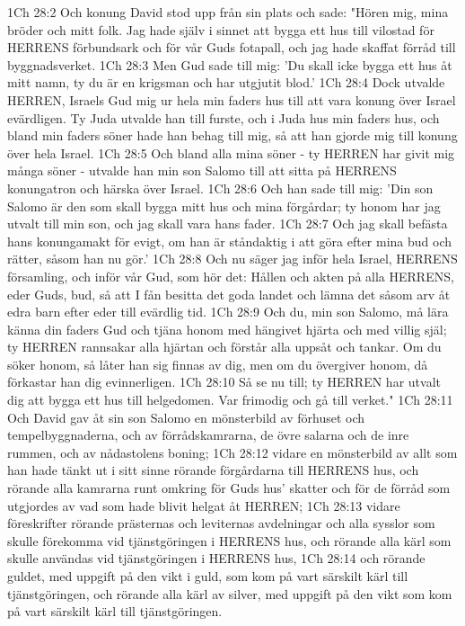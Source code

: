 1Ch 28:2  Och konung David stod upp från sin plats och sade: "Hören mig, mina bröder och mitt folk. Jag hade själv i sinnet att bygga ett hus till vilostad för HERRENS förbundsark och för vår Guds fotapall, och jag hade skaffat förråd till byggnadsverket.
1Ch 28:3  Men Gud sade till mig: 'Du skall icke bygga ett hus åt mitt namn, ty du är en krigsman och har utgjutit blod.'
1Ch 28:4  Dock utvalde HERREN, Israels Gud mig ur hela min faders hus till att vara konung över Israel evärdligen. Ty Juda utvalde han till furste, och i Juda hus min faders hus, och bland min faders söner hade han behag till mig, så att han gjorde mig till konung över hela Israel.
1Ch 28:5  Och bland alla mina söner - ty HERREN har givit mig många söner - utvalde han min son Salomo till att sitta på HERRENS konungatron och härska över Israel.
1Ch 28:6  Och han sade till mig: 'Din son Salomo är den som skall bygga mitt hus och mina förgårdar; ty honom har jag utvalt till min son, och jag skall vara hans fader.
1Ch 28:7  Och jag skall befästa hans konungamakt för evigt, om han är ståndaktig i att göra efter mina bud och rätter, såsom han nu gör.'
1Ch 28:8  Och nu säger jag inför hela Israel, HERRENS församling, och inför vår Gud, som hör det: Hållen och akten på alla HERRENS, eder Guds, bud, så att I fån besitta det goda landet och lämna det såsom arv åt edra barn efter eder till evärdlig tid.
1Ch 28:9  Och du, min son Salomo, må lära känna din faders Gud och tjäna honom med hängivet hjärta och med villig själ; ty HERREN rannsakar alla hjärtan och förstår alla uppsåt och tankar. Om du söker honom, så låter han sig finnas av dig, men om du övergiver honom, då förkastar han dig evinnerligen.
1Ch 28:10  Så se nu till; ty HERREN har utvalt dig att bygga ett hus till helgedomen. Var frimodig och gå till verket."
1Ch 28:11  Och David gav åt sin son Salomo en mönsterbild av förhuset och tempelbyggnaderna, och av förrådskamrarna, de övre salarna och de inre rummen, och av nådastolens boning;
1Ch 28:12  vidare en mönsterbild av allt som han hade tänkt ut i sitt sinne rörande förgårdarna till HERRENS hus, och rörande alla kamrarna runt omkring för Guds hus' skatter och för de förråd som utgjordes av vad som hade blivit helgat åt HERREN;
1Ch 28:13  vidare föreskrifter rörande prästernas och leviternas avdelningar och alla sysslor som skulle förekomma vid tjänstgöringen i HERRENS hus, och rörande alla kärl som skulle användas vid tjänstgöringen i HERRENS hus,
1Ch 28:14  och rörande guldet, med uppgift på den vikt i guld, som kom på vart särskilt kärl till tjänstgöringen, och rörande alla kärl av silver, med uppgift på den vikt som kom på vart särskilt kärl till tjänstgöringen.
